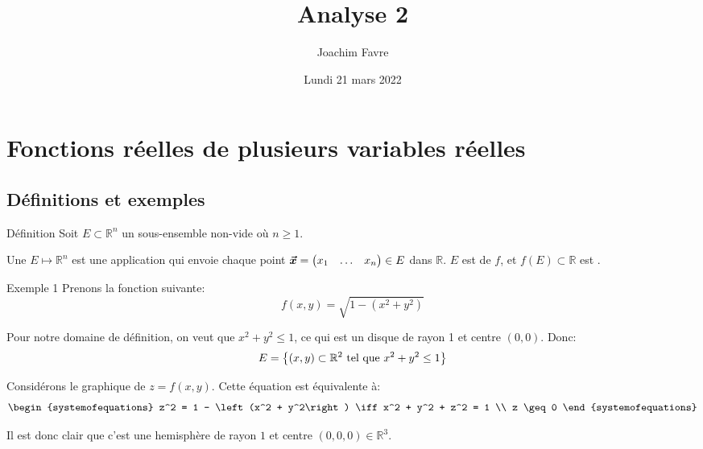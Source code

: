 \documentclass[a4paper]{article}
\title{Analyse 2}
\author{Joachim Favre}
\date{Lundi 21 mars 2022}
\begin{document}
\maketitle


\section{Fonctions réelles de plusieurs variables réelles}
\subsection{Définitions et exemples}
\begin{parag}{Définition}
    Soit $E \subset \mathbb{R}^n$ un sous-ensemble non-vide où $n \geq 1$.

    Une  $E \mapsto \mathbb{R}^n$ est une application qui envoie chaque point $\bm{\protect\vec{x}} = \begin{pmatrix} x_1 & \ldots & x_n \end{pmatrix} \in E$ dans $\mathbb{R}$. $E$ est  de $f$, et $f\left(E\right) \subset \mathbb{R}$ est .
\end{parag}

\begin{parag}{Exemple 1}
    Prenons la fonction suivante: 
    \[f\left(x, y\right) = \sqrt{1 - \left(x^2 + y^2\right)}\]

    Pour notre domaine de définition, on veut que $x^2 + y^2 \leq 1$, ce qui est un disque de rayon 1 et centre $\left(0,0\right)$. Donc: 
    \[E = \left\{\left(x, y\right) \subset \mathbb{R}^2 \telque x^2 + y^2 \leq 1\right\}\]
    
    Considérons le graphique de $z = f\left(x, y\right)$. Cette équation est équivalente à:
    \[\begin{systemofequations} z^2 = 1 - \left(x^2 + y^2\right) \iff x^2 + y^2 + z^2 = 1 \\ z \geq 0 \end{systemofequations}\]
    
    Il est donc clair que c'est une hemisphère de rayon $1$ et centre $\left(0, 0, 0\right) \in \mathbb{R}^3$.
\end{parag}
\end{document}
